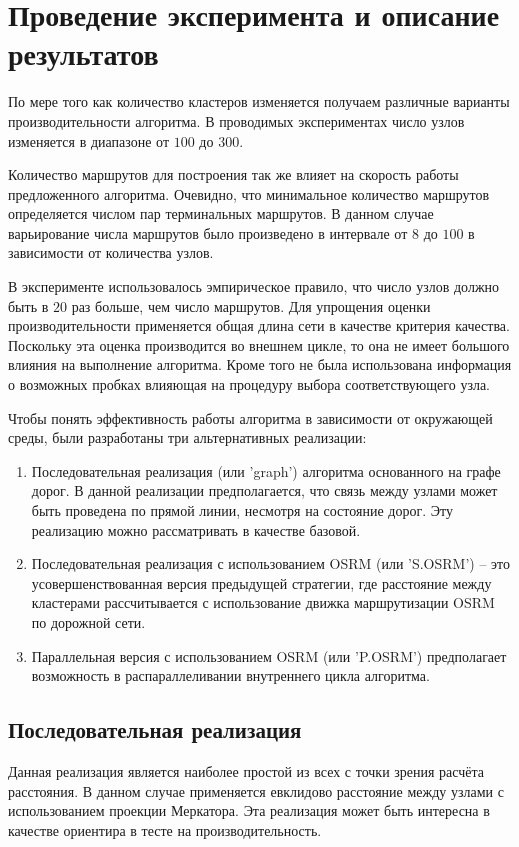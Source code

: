 \section{Проведение эксперимента и описание результатов}
По мере того как количество кластеров изменяется получаем различные варианты производительности алгоритма. 
В проводимых экспериментах число узлов изменяется в диапазоне от \( 100 \) до \( 300 \).

Количество маршрутов для построения так же влияет на скорость работы предложенного алгоритма. Очевидно, что 
минимальное количество маршрутов определяется числом пар терминальных маршрутов. В данном случае варьирование 
числа маршрутов было произведено в интервале от \( 8 \) до \( 100 \) в зависимости от количества узлов.

В эксперименте использовалось эмпирическое правило, что число узлов должно быть в \( 20 \) раз больше, чем 
число маршрутов. Для упрощения оценки производительности применяется общая длина сети в качестве критерия 
качества. Поскольку эта оценка производится во внешнем цикле, то она не имеет большого влияния на выполнение 
алгоритма. Кроме того не была использована информация о возможных пробках влияющая на процедуру выбора 
соответствующего узла.

Чтобы понять эффективность работы алгоритма в зависимости от окружающей среды, были разработаны три 
альтернативных реализации:
\begin{enumerate}
    \item Последовательная реализация (или 'graph') алгоритма основанного на графе дорог. В данной реализации 
        предполагается, что связь между узлами может быть проведена по прямой линии, несмотря на состояние 
        дорог. Эту реализацию можно рассматривать в качестве базовой.
    \item Последовательная реализация с использованием OSRM (или 'S.OSRM') -- это усовершенствованная версия 
        предыдущей стратегии, где расстояние между кластерами рассчитывается с использование движка 
        маршрутизации OSRM по дорожной сети.
    \item Параллельная версия с использованием OSRM (или 'P.OSRM') предполагает возможность в 
        распараллеливании внутреннего цикла алгоритма.  
\end{enumerate}

\clearpage

\subsection{Последовательная реализация}
Данная реализация является наиболее простой из всех с точки зрения расчёта расстояния. В данном случае 
применяется евклидово расстояние между узлами с использованием проекции Меркатора. Эта реализация может быть 
интересна в качестве ориентира в тесте на производительность.

